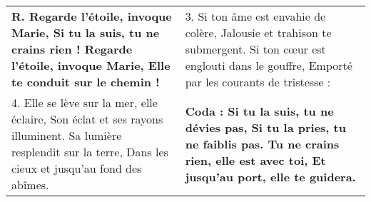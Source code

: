 

\begin{tabular}{p{} p{}}

\textbf{
R. Regarde l’étoile, invoque Marie, \newline
Si tu la suis, tu ne crains rien ! \newline
Regarde l’étoile, invoque Marie, \newline
Elle te conduit sur le chemin !
}

&
%

3.
Si ton âme est envahie de colère, \newline
Jalousie et trahison te submergent. \newline
Si ton cœur est englouti dans le gouffre, \newline
Emporté par les courants de tristesse :

\\

4.
Elle se lève sur la mer, elle éclaire, \newline
Son éclat et ses rayons illuminent. \newline
Sa lumière resplendit sur la terre, \newline
Dans les cieux et jusqu’au fond des abîmes.

&

\textbf{
Coda :
Si tu la suis, tu ne dévies pas, \newline
Si tu la pries, tu ne faiblis pas. \newline
Tu ne crains rien, elle est avec toi, \newline
Et jusqu’au port, elle te guidera. 
}
\end{tabular}
